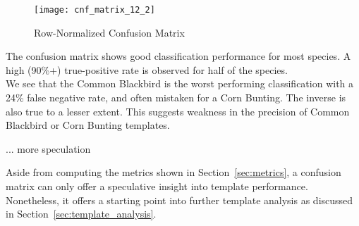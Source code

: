 \begin{figure}[!htb]
  \centering
  \texttt{[image: cnf\_matrix\_12\_2]}
  \caption{Row-Normalized Confusion Matrix}\label{fig:cnf12}
\end{figure}

The confusion matrix shows good classification performance for most species.
A high (90\%+) true-positive rate is observed for half of the species.\\

We see that the Common Blackbird is the worst performing
classification with a 24\% false negative rate, and often mistaken for a Corn Bunting.
The inverse is also true to a lesser extent.
This suggests weakness in the precision of Common Blackbird or Corn Bunting
templates.


... more speculation

Aside from computing the metrics shown in Section~\ref{sec:metrics}, a confusion
matrix can only offer a speculative insight into template performance.
Nonetheless, it offers a starting point into further template analysis as
discussed in Section~\ref{sec:template_analysis}.

